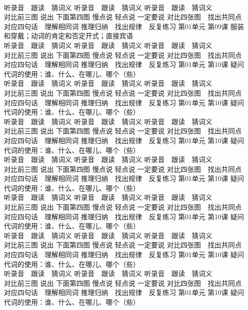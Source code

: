 \documentclass[8pt]{extreport}
\begin{document}
\begin{CJK}{UTF8}{min}
\\	听录音　跟读　猜词义 听录音　跟读　猜词义 听录音　跟读　猜词义 
\\	对比前三图 说出 下面第四图 慢点说 轻点说 一定要说	对比四张图　找出共同点 对应四句话　理解相同词 推理归纳　找出规律　反复练习 第01单元 第09课 服装和穿戴；动词的肯定和否定开式；直接宾语
\\	听录音　跟读　猜词义 听录音　跟读　猜词义 听录音　跟读　猜词义 
\\	对比前三图 说出 下面第四图 慢点说 轻点说 一定要说	对比四张图　找出共同点 对应四句话　理解相同词 推理归纳　找出规律　反复练习 第01单元 第10课 疑问代词的使用：谁、什么、在哪儿、哪个（些）
\\	听录音　跟读　猜词义 听录音　跟读　猜词义 听录音　跟读　猜词义 
\\	对比前三图 说出 下面第四图 慢点说 轻点说 一定要说	对比四张图　找出共同点 对应四句话　理解相同词 推理归纳　找出规律　反复练习 第01单元 第10课 疑问代词的使用：谁、什么、在哪儿、哪个（些）
\\	听录音　跟读　猜词义 听录音　跟读　猜词义 听录音　跟读　猜词义 
\\	对比前三图 说出 下面第四图 慢点说 轻点说 一定要说	对比四张图　找出共同点 对应四句话　理解相同词 推理归纳　找出规律　反复练习 第01单元 第10课 疑问代词的使用：谁、什么、在哪儿、哪个（些）
\\	听录音　跟读　猜词义 听录音　跟读　猜词义 听录音　跟读　猜词义 
\\	对比前三图 说出 下面第四图 慢点说 轻点说 一定要说	对比四张图　找出共同点 对应四句话　理解相同词 推理归纳　找出规律　反复练习 第01单元 第10课 疑问代词的使用：谁、什么、在哪儿、哪个（些）
\\	听录音　跟读　猜词义 听录音　跟读　猜词义 听录音　跟读　猜词义 
\\	对比前三图 说出 下面第四图 慢点说 轻点说 一定要说	对比四张图　找出共同点 对应四句话　理解相同词 推理归纳　找出规律　反复练习 第01单元 第10课 疑问代词的使用：谁、什么、在哪儿、哪个（些）
\\	听录音　跟读　猜词义 听录音　跟读　猜词义 听录音　跟读　猜词义 
\\	对比前三图 说出 下面第四图 慢点说 轻点说 一定要说	对比四张图　找出共同点 对应四句话　理解相同词 推理归纳　找出规律　反复练习 第01单元 第10课 疑问代词的使用：谁、什么、在哪儿、哪个（些）
\\	听录音　跟读　猜词义 听录音　跟读　猜词义 听录音　跟读　猜词义 
\\	对比前三图 说出 下面第四图 慢点说 轻点说 一定要说	对比四张图　找出共同点 对应四句话　理解相同词 推理归纳　找出规律　反复练习 第01单元 第10课 疑问代词的使用：谁、什么、在哪儿、哪个（些）

\end{CJK}
\end{document}
